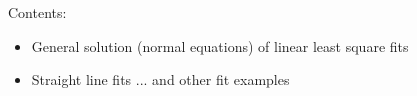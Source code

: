 %
%
%
\begin{slide}
\pagestyle{headings}
\sf 
{}
%
\Large
Contents:
\begin{itemize}
\item
General solution (normal equations)
of linear least square fits
\item 
Straight line fits ... and other fit examples
\end{itemize}
%
\end{slide}



